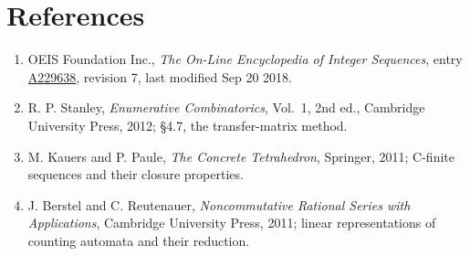 \documentclass[11pt]{article}
\theoremstyle{definition}
\begin{document}
\section{References}

\begin{enumerate}

\item OEIS Foundation Inc., \emph{The On-Line Encyclopedia of Integer Sequences}, entry \href{https://oeis.org/A229638}{A229638}, revision 7, last modified Sep 20 2018.

\item R. P. Stanley, \emph{Enumerative Combinatorics}, Vol.~1, 2nd ed., Cambridge University Press, 2012; \S4.7, the transfer-matrix method.

\item M. Kauers and P. Paule, \emph{The Concrete Tetrahedron}, Springer, 2011; C-finite sequences and their closure properties.

\item J. Berstel and C. Reutenauer, \emph{Noncommutative Rational Series with Applications}, Cambridge University Press, 2011; linear representations of counting automata and their reduction.

\end{enumerate}
\end{document}
